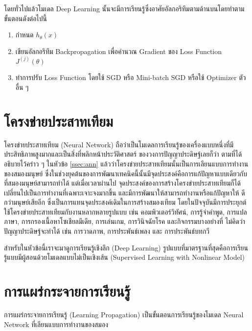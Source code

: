โดยทั่วไปแล้วโมเดล Deep Learning นั้นจะมีการเรียนรู้ซึ่งอาศัยอัลกอริทึมตามด้านบนโดยทำตามขั้นตอนดังต่อไปนี้

\begin{enumerate}
    \item กำหนด $h_\theta(x)$
    
    \item เขียนอัลกอริทึม Backpropagation เพื่อคำนวณ Gradient ของ Loss Function $J^{(j)}(\theta)$
    
    \item ทำการปรับ Loss Function โดยใช้ SGD หรือ Mini-batch SGD หรือใช้ Optimizer ตัวอื่น ๆ
\end{enumerate}

\section{โครงข่ายประสาทเทียม}
\label{sec:nn}

โครงข่ายประสาทเทียม (Neural Network) ถือว่าเป็นโมเดลการเรียนรู้ของเครื่องแบบหนึ่งที่มีประสิทธิภาพสูงมากและเป็นสิ่งที่พลิกหน้าประวัติศาสตร์%
ของวงการปัญญาประดิษฐ์เลยก็ว่า ตามที่ได้อธิบายไว้คร่าว ๆ ในหัวข้อ \ref{ssec:ann} แล้วว่าโครงข่ายประสาทเทียมนั้นเป็นการเลียนแบบการทำงาน%
ของสมองมนุษย์ ซึ่งในช่วงยุคต้นของการพัฒนาเทคนิคนี้นั้นมีจุดประสงค์คือการแก้ปัญหาแบบเดียวกับที่สมองมนุษย์สามารถทำได้ แต่เมื่อเวลาผ่านไป 
จุดประสงค์ของการสร้างโครงข่ายประสาทเทียมก็ได้เปลี่ยนไปเป็นการทำงานที่เฉพาะเจาะจงมากขึ้น และมีการพัฒนาให้สามารถทำงานหรือแก้ปัญหาให้%
ดีกว่ามนุษย์เสียอีก ซึ่งเป็นการแทนจุดประสงค์เดิมในการสร้างสมองเทียม โดยในปัจจุบันมีการประยุกต์ใช้โครงข่ายประสาทเทียมกับงานหลากหลายรูปแบบ 
เช่น คอมพิวเตอร์วิทัศน์, การรู้จำคำพูด, การแปลภาษา, การกรองเนื้อหาโซเชียลมีเดีย, การเล่นเกม, การวินิจฉัยโรค และกิจกรรมบางอย่างที่%
ไม่คิดว่าปัญญาประดิษฐ์จะทำได้ เช่น การวาดภาพ, การประพันธ์เพลง และ การประพันธ์บทกวี

สำหรับในหัวข้อนี้เราจะมาดูการเรียนรู้เชิงลึก (Deep Learning) รูปแบบที่มาตรฐานที่สุดคือการเรียนรู้แบบมีผู้สอนด้วยโมเดลแบบไม่เป็นเชิงเส้น 
(Supervised Learning with Nonlinear Model)

\section{การแผร่กระจายการเรียนรู้}

การแผร่กระจายการเรียนรู้ (Learning Propagation) เป็นขั้นตอนการเรียนรู้ของโมเดล Neural Network ที่เลียนแบบการทำงานของสมอง 


